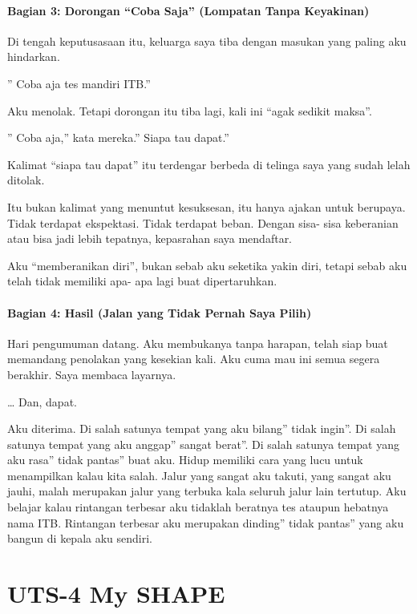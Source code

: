 \documentclass[
  letterpaper,
  DIV=11,
  numbers=noendperiod]{scrreprt}
\begin{document}
\subsubsection{Bagian 3: Dorongan ``Coba Saja'' (Lompatan Tanpa
Keyakinan)}\label{bagian-3-dorongan-coba-saja-lompatan-tanpa-keyakinan}

Di tengah keputusasaan itu, keluarga saya tiba dengan masukan yang
paling aku hindarkan.

'' Coba aja tes mandiri ITB.''

Aku menolak. Tetapi dorongan itu tiba lagi, kali ini ``agak sedikit
maksa''.

'' Coba aja,'' kata mereka.'' Siapa tau dapat.''

Kalimat ``siapa tau dapat'' itu terdengar berbeda di telinga saya yang
sudah lelah ditolak.

Itu bukan kalimat yang menuntut kesuksesan, itu hanya ajakan untuk
berupaya. Tidak terdapat ekspektasi. Tidak terdapat beban. Dengan sisa-
sisa keberanian atau bisa jadi lebih tepatnya, kepasrahan saya
mendaftar.

Aku ``memberanikan diri'', bukan sebab aku seketika yakin diri, tetapi
sebab aku telah tidak memiliki apa- apa lagi buat dipertaruhkan.

\subsubsection{Bagian 4: Hasil (Jalan yang Tidak Pernah Saya
Pilih)}\label{bagian-4-hasil-jalan-yang-tidak-pernah-saya-pilih}

Hari pengumuman datang. Aku membukanya tanpa harapan, telah siap buat
memandang penolakan yang kesekian kali. Aku cuma mau ini semua segera
berakhir. Saya membaca layarnya.

\ldots{} Dan, dapat.

Aku diterima. Di salah satunya tempat yang aku bilang'' tidak ingin''.
Di salah satunya tempat yang aku anggap'' sangat berat''. Di salah
satunya tempat yang aku rasa'' tidak pantas'' buat aku. Hidup memiliki
cara yang lucu untuk menampilkan kalau kita salah. Jalur yang sangat aku
takuti, yang sangat aku jauhi, malah merupakan jalur yang terbuka kala
seluruh jalur lain tertutup. Aku belajar kalau rintangan terbesar aku
tidaklah beratnya tes ataupun hebatnya nama ITB. Rintangan terbesar aku
merupakan dinding'' tidak pantas'' yang aku bangun di kepala aku
sendiri.


\chapter{UTS-4 My SHAPE}\label{uts-4-my-shape}
\end{document}
